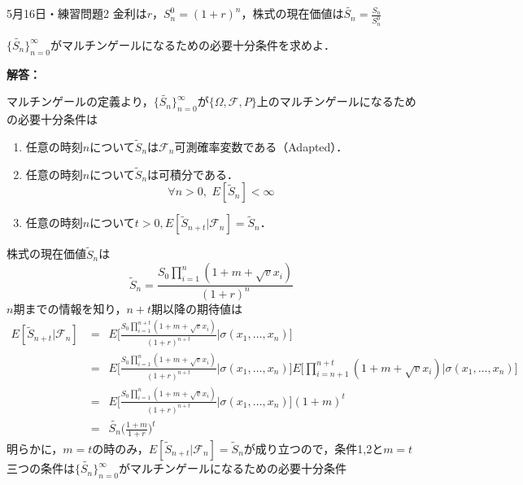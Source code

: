 \documentclass{jsarticle}
\begin{document}
\newpage
\begin{itembox}[l]{5月16日・練習問題2}
金利は$r$，$S_n^0=(1+r)^n$，株式の現在価値は$\tilde{S_n} = \frac{S_n}{S_n^0}$

$\{ \tilde{S_n}\}_{n=0}^\infty $がマルチンゲールになるための必要十分条件を求めよ．
\end{itembox}
{\bf 解答：}

マルチンゲールの定義より，$\{ \tilde{S_n}\}_{n=0}^\infty $が$\{\Omega,\mathcal{F},P\}$上のマルチンゲールになるための必要十分条件は
\begin{enumerate}
\item 任意の時刻$n$について$\tilde{S}_n$は$\mathcal{F}_n$可測確率変数である（Adapted）．
\item 任意の時刻$n$について$\tilde{S}_n$は可積分である．
\[
\forall n > 0, \,\, E[\tilde{S}_n] < \infty
\]
\item 任意の時刻$n$について$t>0, E[\tilde{S}_{n+t}|\mathcal{F}_n]=\tilde{S}_n$．
\end{enumerate}
株式の現在価値$\tilde{S}_n$は
\[
\tilde{S}_n = \frac{S_0\prod_{i=1}^n (1+m+\sqrt{v}x_i)}{ (1+r)^n }
\]
$n$期までの情報を知り，$n+t$期以降の期待値は
\[
\begin{split}
E[\tilde{S}_{n+t}|\mathcal{F}_n] &=\,\,\, E\Bigr[ \frac{S_0\prod_{i=1}^{n+t} (1+m+\sqrt{v}x_i)}{ (1+r)^{n+t} } \Bigr|  \sigma(x_1,\dots,x_n)\Bigr]\\
&=\,\,\, E\Bigr[ \frac{S_0\prod_{i=1}^{n} (1+m+\sqrt{v}x_i)}{ (1+r)^{n+t} } \Bigr|  \sigma(x_1,\dots,x_n)\Bigr]E\Bigr[\prod_{i=n+1}^{n+t} (1+m+\sqrt{v}x_i) \Bigr|  \sigma(x_1,\dots,x_n)\Bigr]\\
&=\,\,\, E\Bigr[ \frac{S_0\prod_{i=1}^{n} (1+m+\sqrt{v}x_i)}{ (1+r)^{n+t} } \Bigr|  \sigma(x_1,\dots,x_n)\Bigr](1+m)^t\\
&=\,\,\, \tilde{S_n}\Bigr(\frac{1+m}{1+r}\Bigr)^t
\end{split}
\]
明らかに，$m=t$の時のみ，$E[\tilde{S}_{n+t}|\mathcal{F}_n]=\tilde{S}_n$が成り立つので，条件1,2と$m=t$三つの条件は$\{ \tilde{S_n}\}_{n=0}^\infty $がマルチンゲールになるための必要十分条件
\end{document}
